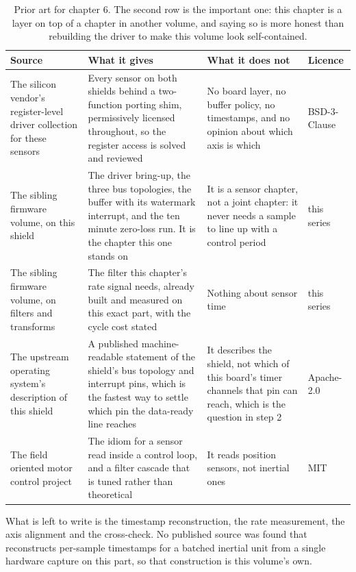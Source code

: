 \begin{table}[H]\centering\small
\begin{tabular}{p{34mm}p{46mm}p{38mm}p{20mm}}
\toprule
Source & What it gives & What it does not & Licence \\
\midrule
The silicon vendor's register-level driver collection for these sensors & Every sensor on both shields behind a two-function porting shim, permissively licensed throughout, so the register access is solved and reviewed & No board layer, no buffer policy, no timestamps, and no opinion about which axis is which & BSD-3-Clause \\
The sibling firmware volume, on this shield & The driver bring-up, the three bus topologies, the buffer with its watermark interrupt, and the ten minute zero-loss run. It is the chapter this one stands on & It is a sensor chapter, not a joint chapter: it never needs a sample to line up with a control period & this series \\
The sibling firmware volume, on filters and transforms & The filter this chapter's rate signal needs, already built and measured on this exact part, with the cycle cost stated & Nothing about sensor time & this series \\
The upstream operating system's description of this shield & A published machine-readable statement of the shield's bus topology and interrupt pins, which is the fastest way to settle which pin the data-ready line reaches & It describes the shield, not which of this board's timer channels that pin can reach, which is the question in step 2 & Apache-2.0 \\
The field oriented motor control project & The idiom for a sensor read inside a control loop, and a filter cascade that is tuned rather than theoretical & It reads position sensors, not inertial ones & MIT \\
\bottomrule
\end{tabular}
\caption{Prior art for chapter 6. The second row is the important one: this chapter is a layer on top of a chapter in another volume, and saying so is more honest than rebuilding the driver to make this volume look self-contained.}
\end{table}

What is left to write is the timestamp reconstruction, the rate measurement, the
axis alignment and the cross-check. No published source was found that
reconstructs per-sample timestamps for a batched inertial unit from a single
hardware capture on this part, so that construction is this volume's own.

